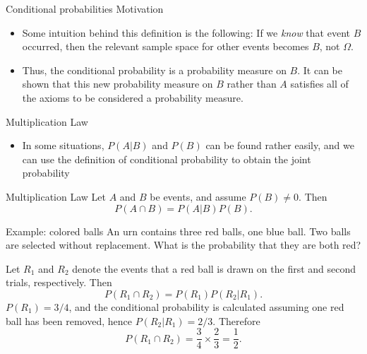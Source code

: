 \begin{frame}[allowframebreaks]{Conditional probabilities Motivation}
  \begin{itemize}
    \item Some intuition behind this definition is the following: If we \emph{know} that event $B$ occurred, then the relevant sample space for other events becomes $B$, not $\Omega$.
    \item Thus, the conditional probability is a probability measure on $B$. It can be shown that this new probability measure on $B$ rather than $A$ satisfies all of the axioms to be considered a probability measure.
  \end{itemize}
  
\end{frame}

\begin{frame}[allowframebreaks]{Multiplication Law}

  \begin{itemize}
    \item In some situations, $P(A|B)$ and $P(B)$ can be found rather easily, and we can use the definition of conditional probability to obtain the joint probability
  \end{itemize}
  \begin{block}{Multiplication Law}
    Let $A$ and $B$ be events, and assume $P(B) \neq 0$. Then
    $$
    P(A \cap B) = P(A|B)P(B).
    $$
  \end{block}
  
  \begin{exampleblock}{Example: colored balls}
    An urn contains three red balls, one blue ball. Two balls are selected without replacement. What is the probability that they are both red? 
    
    Let $R_1$ and $R_2$ denote the events that a red ball is drawn on the first and second trials, respectively. Then
    $$
    P(R_1 \cap R_2) = P(R_1)P(R_2 | R_1).
    $$
    $P(R_1) = 3/4$, and the conditional probability is calculated assuming one red ball has been removed, hence $P(R_2 | R_1) = 2/3$. Therefore
    $$
    P(R_1 \cap R_2) = \frac{3}{4}\times\frac{2}{3} = \frac{1}{2}.
    $$
  \end{exampleblock}
\end{frame}

